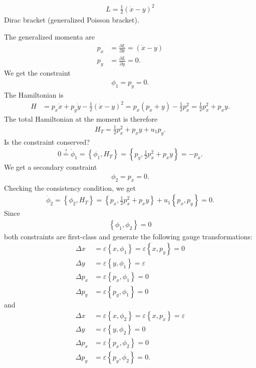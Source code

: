 \begin{exercise}
\begin{align*}
L = \frac{1}{2} (\dot{x} - y)^2
\end{align*}
Dirac bracket (generalized Poisson bracket).
\end{exercise}
\begin{solution}
The generalized momenta are
\begin{align*}
p_x &= \frac{\partial L}{\partial \dot{x}} = (\dot{x} - y) \\
p_y &= \frac{\partial L}{\partial \dot{y}} = 0.
\end{align*}
We get the constraint 
\begin{align*}
\phi_1 = p_y = 0.
\end{align*}
The Hamiltonian is
\begin{align*}
H &= p_x \dot{x} + p_y \dot{y} - \frac{1}{2} (\dot{x} - y)^2 = p_x (p_x + y) - \frac{1}{2} p_x^2 = \frac{1}{2} p_x^2 + p_x y.
\end{align*}
The total Hamiltonian at the moment is therefore
\begin{align*}
H_T = \frac{1}{2} p_x^2 + p_x y + u_1 p_y.
\end{align*}
Is the constraint conserved?
\begin{align*}
0 \overset{?}{=} \dot{\phi}_1 = \left \{ \phi_1,H_T \right \} = \left \{ p_y,\frac{1}{2} p_x^2 + p_x y \right \} = - p_x.
\end{align*}
We get a secondary constraint 
\begin{align*}
\phi_2 = p_x = 0.
\end{align*}
Checking the consistency condition, we get
\begin{align*}
\dot{\phi}_2 = \left \{ \phi_2,H_T \right \} = \left \{ p_x,\frac{1}{2} p_x^2 + p_x y \right \} + u_1 \left \{ p_x,p_y \right \} = 0.
\end{align*}
Since 
\begin{align*}
\left \{ \phi_1,\phi_2 \right \} = 0
\end{align*}
both constraints are first-class and generate the following gauge transformations:
\begin{align*}
\Delta x &= \varepsilon \left \{ x,\phi_1 \right \} = \varepsilon \left \{ x,p_y \right \} = 0 \\
\Delta y &= \varepsilon \left \{ y,\phi_1 \right \} = \varepsilon \\
\Delta p_x &= \varepsilon \left \{ p_x,\phi_1 \right \} = 0 \\
\Delta p_y &= \varepsilon \left \{ p_y,\phi_1 \right \} = 0
\end{align*}
and
\begin{align*}
\Delta x &= \varepsilon \left \{ x,\phi_2 \right \} = \varepsilon \left \{ x,p_x \right \} = \varepsilon \\
\Delta y &= \varepsilon \left \{ y,\phi_2 \right \} = 0 \\
\Delta p_x &= \varepsilon \left \{ p_x,\phi_2 \right \} = 0 \\
\Delta p_y &= \varepsilon \left \{ p_y,\phi_2 \right \} = 0.
\end{align*}


\end{solution}
